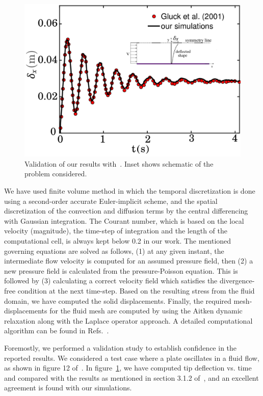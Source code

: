 \documentclass[aps,pre,twocolumn,aps,longbibliography]{revtex4-1}
\begin{document}
	\begin{figure}
		\begin{minipage}[c]{1\linewidth}
			\includegraphics[width=1\linewidth]{Fig02.pdf} 
		\end{minipage} 
		\caption{Validation of our results with~\cite{Gluck2001}. Inset shows schematic of the problem considered.}
		\label{validation1}
	\end{figure}
	
	We have used finite volume method in which the temporal discretization is done using a second-order accurate Euler-implicit scheme, and the spatial discretization of the convection and diffusion terms by the central differencing with Gaussian integration. The Courant number, which is based on the local velocity (magnitude), the time-step of integration and the length of the computational cell, is always kept below 0.2 in our work. The mentioned governing equations are solved as follows, (1) at any given instant, the intermediate flow velocity is computed for an assumed pressure field, then (2) a new pressure field is calculated from the pressure-Poisson equation. This is followed by (3) calculating a correct velocity field which satisfies the divergence-free condition at the next time-step. Based on the resulting stress from the fluid domain, we have computed the solid displacements. Finally, the required mesh-displacements for the fluid mesh are computed by using the Aitken dynamic relaxation along with the Laplace operator approach. A detailed computational algorithm can be found in Refs.~\cite{Hrvoje2007, CampbellPaterson2011}.
	
	Foremostly, we performed a validation study to establish confidence in the reported results. We considered a test case where a plate oscillates in a fluid flow, as shown in figure 12 of~\cite{Gluck2001}. In figure~\ref{validation1}, we have computed tip deflection vs. time and compared with the results as mentioned in section 3.1.2 of~\cite{Gluck2001}, and an excellent agreement is found with our simulations.
	
\end{document}
